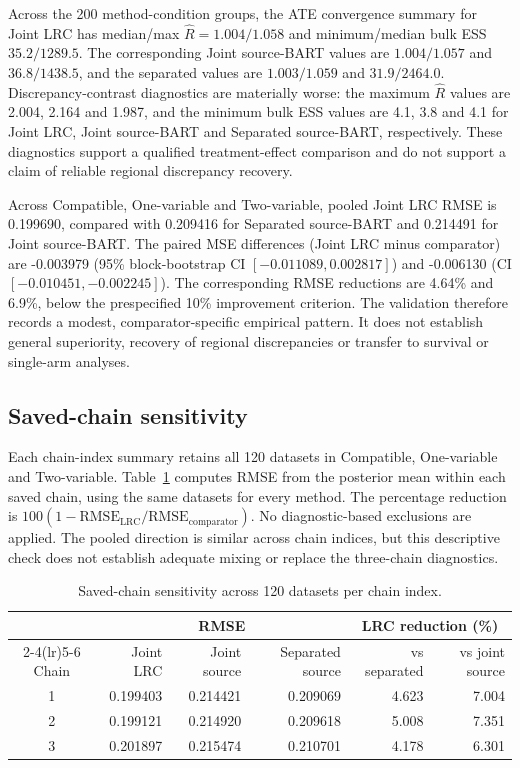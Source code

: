 Across the 200 method-condition groups, the ATE convergence summary for Joint LRC has median/max $\widehat R=1.004/1.058$ and minimum/median bulk ESS $35.2/1289.5$. The corresponding Joint source-BART values are $1.004/1.057$ and $36.8/1438.5$, and the separated values are $1.003/1.059$ and $31.9/2464.0$. Discrepancy-contrast diagnostics are materially worse: the maximum $\widehat R$ values are 2.004, 2.164 and 1.987, and the minimum bulk ESS values are 4.1, 3.8 and 4.1 for Joint LRC, Joint source-BART and Separated source-BART, respectively. These diagnostics support a qualified treatment-effect comparison and do not support a claim of reliable regional discrepancy recovery.

Across Compatible, One-variable and Two-variable, pooled Joint LRC RMSE is 0.199690, compared with 0.209416 for Separated source-BART and 0.214491 for Joint source-BART. The paired MSE differences (Joint LRC minus comparator) are -0.003979 (95\% block-bootstrap CI $[-0.011089,0.002817]$) and -0.006130 (CI $[-0.010451,-0.002245]$). The corresponding RMSE reductions are 4.64\% and 6.9\%, below the prespecified 10\% improvement criterion. The validation therefore records a modest, comparator-specific empirical pattern. It does not establish general superiority, recovery of regional discrepancies or transfer to survival or single-arm analyses.


\subsection{Saved-chain sensitivity}
Each chain-index summary retains all 120 datasets in Compatible, One-variable and Two-variable. Table~\ref{tab:joint_chain_sensitivity} computes RMSE from the posterior mean within each saved chain, using the same datasets for every method. The percentage reduction is $100(1-\mathrm{RMSE}_{\mathrm{LRC}}/\mathrm{RMSE}_{\mathrm{comparator}})$. No diagnostic-based exclusions are applied. The pooled direction is similar across chain indices, but this descriptive check does not establish adequate mixing or replace the three-chain diagnostics.
\begin{table}[htbp]
\centering\small
\caption{Saved-chain sensitivity across 120 datasets per chain index.}
\label{tab:joint_chain_sensitivity}
\begin{tabular}{crrrrr}
\toprule
&\multicolumn{3}{c}{RMSE}&\multicolumn{2}{c}{LRC reduction (\%)}\\
\cmidrule(lr){2-4}\cmidrule(lr){5-6}
Chain & Joint LRC & Joint source & Separated source & vs separated & vs joint source\\
\midrule
1 & 0.199403 & 0.214421 & 0.209069 & 4.623 & 7.004\\
2 & 0.199121 & 0.214920 & 0.209618 & 5.008 & 7.351\\
3 & 0.201897 & 0.215474 & 0.210701 & 4.178 & 6.301\\
\bottomrule
\end{tabular}
\end{table}
